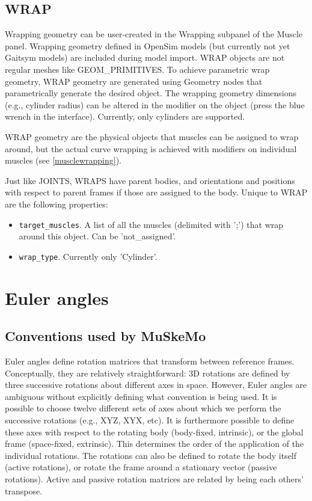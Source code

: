 \documentclass{article}
\begin{document}
\subsection{WRAP}
\label{sec:wrapgeom}

Wrapping geometry can be user-created in the Wrapping subpanel of the Muscle panel. Wrapping geometry defined in OpenSim models (but currently not yet Gaitsym models) are included during model import. WRAP objects are not regular meshes like GEOM\_PRIMITIVES. To achieve parametric wrap geometry, WRAP geometry are generated using Geometry nodes that parametrically generate the desired object. The wrapping geometry dimensions (e.g., cylinder radius) can be altered in the modifier on the object (press the blue wrench in the interface). Currently, only cylinders are supported.

WRAP geometry are the physical objects that muscles can be assigned to wrap around, but the actual curve wrapping is achieved with modifiers on individual muscles (see \ref{musclewrapping}).

Just like JOINTS, WRAPS have parent bodies, and orientations and positions with respect to parent frames if those are assigned to the body. Unique to WRAP are the following properties:

\begin{itemize}
    \item \texttt{target\_muscles}. A list of all the muscles (delimited with ';') that wrap around this object. Can be 'not\_assigned'.
    \item \texttt{wrap\_type}. Currently only 'Cylinder'.
\end{itemize}
 
\appendix
\section{Euler angles}
\label{sec:eulerangles}

\subsection{Conventions used by MuSkeMo}
Euler angles define rotation matrices that transform between reference frames. Conceptually, they are relatively straightforward: 3D rotations are defined by three successive rotations about different axes in space. However, Euler angles are ambiguous without explicitly defining what convention is being used. It is possible to choose twelve different sets of axes about which we perform the successive rotations (e.g., XYZ, XYX, etc). It is furthermore possible to define these axes with respect to the rotating body (body-fixed, intrinsic), or the global frame (space-fixed, extrinsic). This determines the order of the application of the individual rotations. The rotations can also be defined to rotate the body itself (active rotations), or rotate the frame around a stationary vector (passive rotations). Active and passive rotation matrices are related by being each others' transpose.
\end{document}
